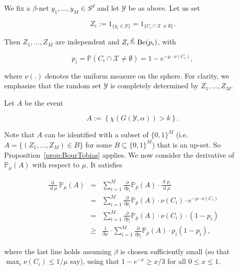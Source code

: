 \documentclass[11pt]{article}%
\newcommand{\Xcal}[0]{\ensuremath{{\mathcal X}}}
\newcommand{\Ycal}[0]{\ensuremath{{\mathcal Y}}}
\newcommand{\Pee}[0]{\ensuremath{{\mathbb P}}}
\newcommand{\isd}[0]{\hspace{.2ex} \raisebox{-.1ex}{$=$} \hspace{-1.5ex} 
\raisebox{1ex}{{$\scriptstyle d$}} \hspace{.8ex} }
\DeclareMathOperator{\Be}{Be}
\DeclareMathOperator{\dd}{d}
\begin{document}
We fix a $\beta$-net $y_1,\dots,y_M \in S^d$ and let $\Ycal$ be as above.
Let us set 

$$ Z_i := 1_{\{y_i \in \Ycal\}} = 1_{\{C_i \cap \Xcal \neq \emptyset\}}. $$

Then $Z_1,\dots,Z_M$ are independent and $Z_i \isd \Be(p_i)$, with

$$ p_i = \Pee( C_i \cap \Xcal \neq \emptyset ) = 1 - e^{-\mu\cdot\nu(C_i)}, $$

\noindent 
where $\nu(.)$ denotes the uniform measure on the sphere.
For clarity, we emphasize that the random set $\Ycal$ is completely determined 
by $Z_1,\dots, Z_M$.

Let $A$ be the event

$$ A := \left\{ \chi( G(\Ycal,\alpha) ) > k \right\}. $$

Note that $A$ can be identified with a subset of $\{0,1\}^M$ 
(i.e.~$A = \{ (Z_1,\dots,Z_M) \in B \}$ for some $B \subseteq \{0,1\}^M$)
that is an up-set. So 
Proposition~\ref{prop:BourTobias} applies.
We now consider the derivative of $\Pee_\mu(A)$ with respect to $\mu$.
It satisfies

\begin{equation}\label{eq:muderiv} 
\begin{array}{rcl}
    \frac{\dd}{\dd\mu} \Pee_\mu ( A ) 
    & = & \displaystyle
    \sum_{i=1}^M \frac{\partial}{\partial p_i} \Pee_{\overline{p}}( A )  \cdot \frac{\dd p_i}{\dd\mu} \\
    & = & \displaystyle
    \sum_{i=1}^M \frac{\partial}{\partial p_i} \Pee_{\overline{p}}( A )  \cdot \nu(C_i) \cdot e^{-\mu\cdot\nu(C_i)} \\
    & = & \displaystyle
    \sum_{i=1}^M \frac{\partial}{\partial p_i} \Pee_{\overline{p}}( A )  \cdot \nu(C_i) \cdot (1-p_i) \\
    & \geq & \displaystyle 
    \frac{1}{3\mu} \cdot \sum_{i=1}^M \frac{\partial}{\partial p_i} \Pee_{\overline{p}}( A )  \cdot p_i(1-p_i),
\end{array} 
\end{equation}

   \noindent
where the last line holds assuming $\beta$ is chosen sufficiently small
(so that $\max_i \nu(C_i) \leq 1/\mu$ say), 
using that $1-e^{-x} \geq x/3$ for all $0\leq x \leq 1$.
\end{document}
